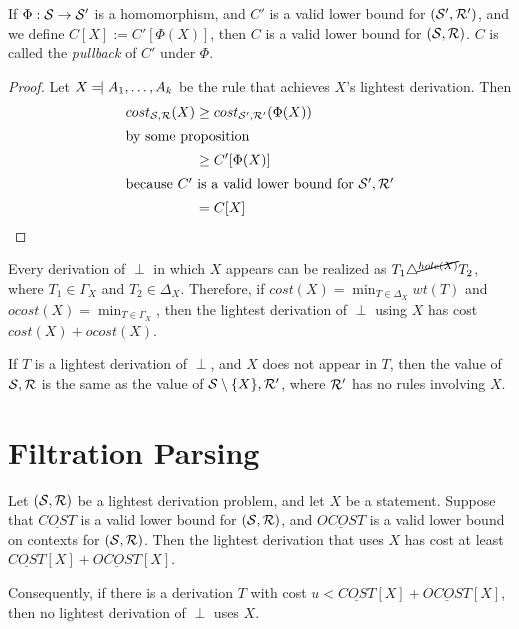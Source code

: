 \begin{lem}
  If $\Phi:{\mathcal S} \to {\mathcal S}'$ is a homomorphism, and $C'$ is a valid
  lower bound for $({\mathcal S}',{\mathcal R}')$, and we define $C[X] :=
  C'[\Phi(X)]$, then $C$ is a valid lower bound for $({\mathcal S},{\mathcal R})$. $C$
  is called the {\em pullback} of $C'$ under $\Phi$.
\end{lem}
\begin{proof}
  Let $X\tne A_1,\dots, A_k$ be the rule that achieves $X$'s lightest
  derivation. Then
\begin{align*}
 cost_{{\mathcal S},{\mathcal R}}(X) &\ge cost_{{\mathcal S}',{\mathcal R}'}(\Phi(X))\\
\intertext{by some proposition}
 &\ge C'[\Phi(X)] \\
\intertext{because $C'$ is a valid lower bound for ${\mathcal S}',{\mathcal R}'$}
 &= C[X]
\end{align*}
\end{proof}

\begin{obs}
  Every derivation of $\perp$ in which $X$ appears can be realized as
  $T_1 \triangle^{\cancel{hole(X)}} T_2$, where $T_1\in \Gamma_X$ and
  $T_2\in \Delta_X$. Therefore, if $cost(X) = \min_{T\in \Delta_X}
  wt(T)$ and $ocost(X) = \min_{T\in \Gamma_X}$, then the lightest
  derivation of $\perp$ using $X$ has cost $cost(X) + ocost(X)$.
\end{obs}

\begin{lem}
  If $T$ is a lightest derivation of $\perp$, and $X$ does not appear
  in $T$, then the value of ${\mathcal S},{\mathcal R}$ is the same as the value of
  ${\mathcal S}\setminus \{X\}, {\mathcal R}'$, where ${\mathcal R}'$ has no rules involving $X$.
\end{lem}



\section{Filtration Parsing}


\begin{thm}
\label{thm-filt-test}
  Let $({\mathcal S},{\mathcal R})$ be a lightest derivation problem, and let $X$ be a
  statement. Suppose that $\underline{COST}$ is a valid lower bound
  for $({\mathcal S},{\mathcal R})$, and $\underline{OCOST}$ is a valid lower bound on
  contexts for $({\mathcal S},{\mathcal R})$. Then the lightest derivation that uses
  $X$ has cost at least $\underline{COST}[X] + \underline{OCOST}[X]$.

  Consequently, if there is a derivation $T$ with cost $u <
  \underline{COST}[X] + \underline{OCOST}[X]$, then no lightest
  derivation of $\perp$ uses $X$.
\end{thm}

